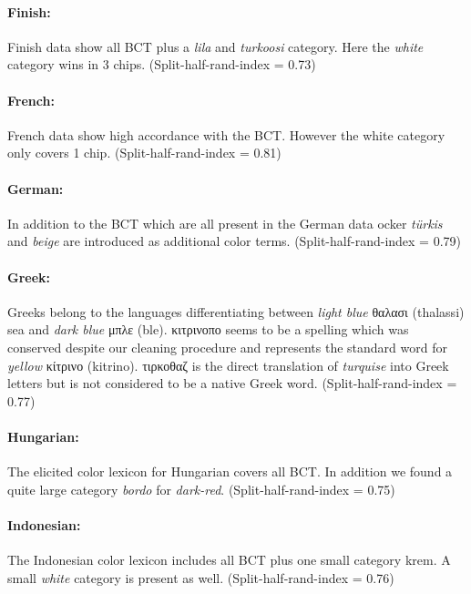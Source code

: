 \paragraph{Finish:}
Finish data show all BCT plus a \textit{lila} and \textit{turkoosi} category.
Here the \textit{white} category wins in 3 chips.
(Split-half-rand-index = 0.73)

\paragraph{French:}
French data show high accordance with the BCT. However the white category only covers 1 chip.
(Split-half-rand-index = 0.81)

\paragraph{German:}
In addition to the BCT which are all present in the German data ocker \textit{türkis} and \textit{beige} are introduced as additional color terms.
(Split-half-rand-index = 0.79)

\paragraph{Greek:}
Greeks belong to the languages differentiating between \textit{light blue} \textgreek{θαλασι} (thalassi) sea and \textit{dark blue} \textgreek{μπλε} (ble).
\textgreek{κιτρινοπο} seems to be a spelling which was conserved despite our cleaning procedure and represents the standard word for \textit{yellow} \textgreek{κίτρινο} (kitrino).
\textgreek{τιρκοθαζ} is the direct translation of \textit{turquise} into Greek letters but is not considered to be a native Greek word.
(Split-half-rand-index = 0.77)

\paragraph{Hungarian:}
The elicited color lexicon for Hungarian covers all BCT.
In addition we found a quite large category \textit{bordo} for \textit{dark-red}.
(Split-half-rand-index = 0.75)

\paragraph{Indonesian:}
The Indonesian color lexicon includes all BCT plus one small category krem.
A small \textit{white} category is present as well.
(Split-half-rand-index = 0.76)

